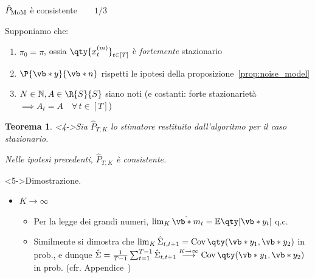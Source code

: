 \documentclass[10pt,xcolor={table,dvipsnames}]{beamer} 		%
\theoremstyle{plain}					%
\newtheorem{teorema}{Teorema}%
\theoremstyle{definition}
\theoremstyle{remark}
\newcommand{\Cov}[1]{\operatorname{Cov}\qty(#1)}
\begin{document}
	\begin{frame}
        {\hypertarget{frame:teorema_1_part1}{$\hat{P}_{\textup{MoM}}$ è consistente$\qquad 1/3$}}

        Supponiamo che:
        \begin{enumerate}
            \item $\pi_0=\pi$, ossia $\qty{x_t^{(m)}}_{t\in[T]}$ è \emph{fortemente} stazionario
            \item<2-> $\P{\vb*{y}}{\vb*{n}}$ rispetti le ipotesi della proposizione~\ref{prop:noise_model}
            \item<3-> $N\in\mathbb{N}, A\in\R{S}{S}$ siano noti {\smaller (e costanti: forte stazionarietà $\implies A_t=A\quad\forall\,t\in[T]$)}
        \end{enumerate}

        \begin{teorema}<4->\label{teor:consistenza_P_mom}
            Sia $\hat{P}_{T,K}$ lo stimatore restituito dall'algoritmo per il caso stazionario.

            Nelle ipotesi precedenti, $\hat{P}_{T,K}$ è consistente.%
        \end{teorema}
        \begin{block}<5->{Dimostrazione.}
            \begin{itemize}
                \item ${K\to\infty}$
                \begin{itemize}
                    \item<5-> Per la legge dei grandi numeri, $\lim_K\hat{\vb*{m}}_t=\mathbb{E}\qty[\vb*{y}_t]$ q.c.
                    \item<7-> Similmente si dimostra che $\lim_K\hat{\Sigma}_{t,t+1}=\Cov{\vb*{y}_1,\vb*{y}_2}$ in prob.,
                    e dunque $\hat{\Sigma}=\frac{1}{T-1}\sum_{t=1}^{T-1}\hat{\Sigma}_{t,t+1}\overset{K\to\infty}{\longrightarrow}\Cov{\vb*{y}_1,\vb*{y}_2}$ in prob.
                    (cfr. Appendice~\hyperlink{frame:teorema1_lim_Sigmahat:appendice}{\faHandPointRight})
                \end{itemize}
            \end{itemize}
        \end{block}
    \end{frame}
\end{document}
